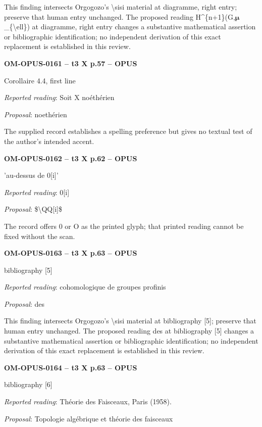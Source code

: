 This finding intersects Orgogozo's \textbackslash{}sisi material at diagramme, right entry; preserve that human entry unchanged. The proposed reading H\textasciicircum{}\{n+1\}(G,\ensuremath{𝛍}\_\{\textbackslash{}ell\}) at diagramme, right entry changes a substantive mathematical assertion or bibliographic identification; no independent derivation of this exact replacement is established in this review.\par
\par\noindent\textbf{OM-OPUS-0161 -- t3 X p.57 -- OPUS}\par
Corollaire 4.4, first line\par
\emph{Reported reading}: Soit X noéthérien\par
\emph{Proposal}: noethérien\par
The supplied record establishes a spelling preference but gives no textual test of the author's intended accent.\par
\par\noindent\textbf{OM-OPUS-0162 -- t3 X p.62 -- OPUS}\par
'au-dessus de 0[i]'\par
\emph{Reported reading}: 0[i]\par
\emph{Proposal}: \$\textbackslash{}QQ[i]\$\par
The record offers 0 or O as the printed glyph; that printed reading cannot be fixed without the scan.\par
\par\noindent\textbf{OM-OPUS-0163 -- t3 X p.63 -- OPUS}\par
bibliography [5]\par
\emph{Reported reading}: cohomologique de groupes profinis\par
\emph{Proposal}: des\par
This finding intersects Orgogozo's \textbackslash{}sisi material at bibliography [5]; preserve that human entry unchanged. The proposed reading des at bibliography [5] changes a substantive mathematical assertion or bibliographic identification; no independent derivation of this exact replacement is established in this review.\par
\par\noindent\textbf{OM-OPUS-0164 -- t3 X p.63 -- OPUS}\par
bibliography [6]\par
\emph{Reported reading}: Théorie des Faisceaux, Paris (1958).\par
\emph{Proposal}: Topologie algébrique et théorie des faisceaux\par
